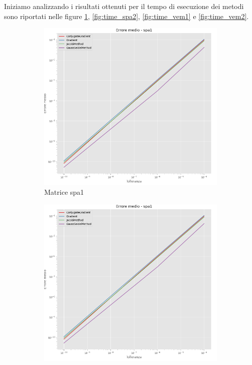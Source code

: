 Iniziamo analizzando i risultati ottenuti per il tempo di esecuzione dei metodi
sono riportati nelle figure \ref{fig:time_spa1}, \ref{fig:time_spa2}, \ref{fig:time_vem1}
e \ref{fig:time_vem2}.
\begin{figure}[!ht]
    \centering
    \begin{subfigure}{0.45\textwidth}
        \centering
        \includegraphics[width=\textwidth]{./img/error_spa1.png}
        \caption{Matrice spa1}
        \label{fig:time_spa1}
    \end{subfigure}
    \hfill
    \begin{subfigure}{0.45\textwidth}
        \centering
        \includegraphics[width=\textwidth]{./img/error_spa1.png}

\end{subfigure}
\end{figure}
